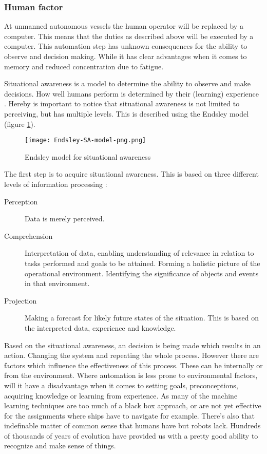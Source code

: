 \subsubsection{Human factor}
At unmanned autonomous vessels the human operator will be replaced by a computer. This means that the duties as described above will be executed by a computer. This automation step has unknown consequences for the ability to observe and decision making. While it has clear advantages when it comes to memory and reduced concentration due to fatigue.

Situational awareness is a model to determine the ability to observe and make decisions. How well humans perform is determined by their (learning) experience \cite{Underwood2013}. Hereby is important to notice that situational awareness is not limited to perceiving, but has multiple levels. This is described using the Endsley model (figure \ref{fig:Endsley-SA-model}).

\begin{figure}[H]
	\centering
	\texttt{[image: Endsley-SA-model-png.png]}
	\caption{Endsley model for situational awareness}
	\label{fig:Endsley-SA-model}
\end{figure}

The first step is to acquire situational awareness. This is based on three different levels of information processing \cite{Kalloniatis2017}: 
\begin{description}
	\item [Perception] Data is merely perceived.
	\item [Comprehension] Interpretation of data, enabling understanding of relevance in relation to tasks performed and goals to be attained. Forming a holistic picture of the operational environment. Identifying the significance of objects and events in that environment.
	\item [Projection] Making a forecast for likely future states of the situation. This is based on the interpreted data, experience and knowledge.
\end{description}

Based on the situational awareness, an decision is being made which results in an action. Changing the system and repeating the whole process. However there are factors which influence the effectiveness of this process. These can be internally or from the environment. Where automation is less prone to environmental factors, will it have a disadvantage when it comes to setting goals, preconceptions, acquiring knowledge or learning from experience. As many of the machine learning techniques are too much of a black box approach, or are not yet effective for the assignments where ships have to navigate for example. There’s also that indefinable matter of common sense that humans have but robots lack. Hundreds of thousands of years of evolution have provided us with a pretty good ability to recognize and make sense of things.

